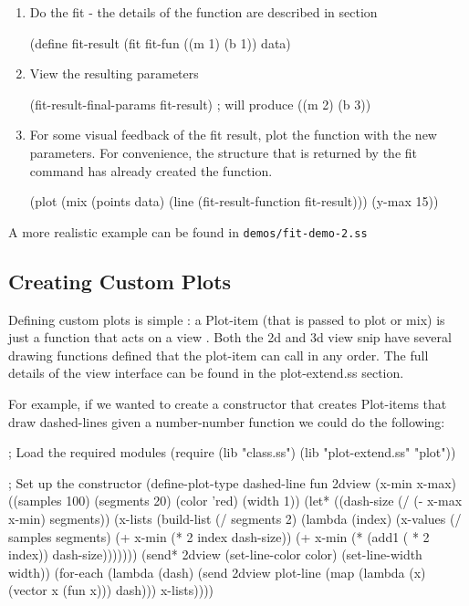 \documentclass{article}
\begin{document}
{\begin{enumerate}
\item Do the fit - the details of the function are described in  section
\begin{schemedisplay}

(define fit-result 
  (fit 
   fit-fun 
   ((m 1) (b 1)) 
   data)
\end{schemedisplay}

\item View the resulting parameters
\begin{schemedisplay}

(fit-result-final-params fit-result) ; will produce ((m 2) (b 3))         
         
\end{schemedisplay}

\item For some visual feedback of the fit result, plot the function 
         with the new parameters. For convenience, the structure that is returned
         by the fit command has already created the function.
\begin{schemedisplay}

(plot (mix 
        (points data)
        (line (fit-result-function fit-result)))
      (y-max 15))
\end{schemedisplay}

\end{enumerate}

A more realistic example can be found in {\tt demos/fit-demo-2.ss}

\subsection{Creating Custom Plots}


Defining custom plots is simple : a Plot-item (that is passed to plot or mix) is just a function
       that acts on a  {view }. Both the 2d and 3d view snip have several drawing
functions defined that
the plot-item can call in any order. The full details of the view interface can be found in the
 {plot-extend.ss} section. 


For example, if we wanted to create a constructor that creates Plot-items that 
       draw dashed-lines given a number-number function we could do the following:
\begin{schemedisplay}
; Load the required modules
(require (lib "class.ss")
         (lib "plot-extend.ss" "plot"))


; Set up the constructor
(define-plot-type dashed-line
  fun 2dview (x-min x-max) ((samples 100) (segments 20) (color 'red) (width 1))
  (let* ((dash-size (/ (- x-max x-min) segments))
	 (x-lists (build-list 
		   (/ segments 2) 
		   (lambda (index)                                    
		     (x-values 
		      (/ samples segments) 
		      (+ x-min (* 2 index dash-size))
		      (+ x-min (* (add1 ( * 2 index)) dash-size)))))))
    (send* 2dview 
	   (set-line-color color)
	   (set-line-width width))
    (for-each 
     (lambda (dash)
       (send 2dview plot-line 
              (map (lambda (x) (vector x (fun x))) dash))) 
     x-lists))))


\end{schemedisplay}}
\end{document}
